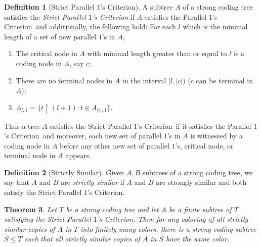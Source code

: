 \documentclass{amsart}
\newtheorem{thm}{Theorem}[section]
\theoremstyle{remark}
\theoremstyle{definition}
\newtheorem{defn}[thm]{Definition}
\theoremstyle{remark}
\newcommand{\re}{\restriction}
\newcommand{\POC}{Parallel $1$'s Criterion}
\newcommand{\SPOC}{Strict Parallel $1$'s Criterion}
\begin{document}
\begin{defn}[\SPOC]\label{defn.strPOC}
A  subtree $A$ of a strong coding tree satisfies the {\em \SPOC}
if $A$ satisfies the \POC\ and additionally, the following hold:
For each  $l$ which is  the minimal length of a set of new parallel $1$'s in $A$,
\begin{enumerate}
\item
The critical node in $A$ with minimal length greater than or equal to  $l$ is a coding node in $A$, say $c$;
\item
There are no terminal nodes in $A$ in the interval $[l,|c|)$  ($c$ can be terminal in $A$);
\item
$A_{l,1}=\{t\re (l+1):t\in A_{|c|,1}\}$.
\end{enumerate}
\end{defn}


Thus a tree $A$ satisfies the \SPOC\ if it satisfies the \POC\ and moreover,
each  new set of parallel $1$'s in $A$ is witnessed by a coding node in $A$ before any other new set of parallel $1$'s,  critical node, or terminal node in $A$ appears.



\begin{defn}[Strictly Similar]\label{defn.strictly.similar}
Given $A,B$ subtrees of a strong coding tree,
we say that $A$ and $B$ are {\em strictly similar}
if $A$ and $B$ are strongly similar and both satisfy the \SPOC.
\end{defn}



\begin{thm}\label{thm.MillikenIPOC}
Let $T$
 be a strong coding tree
and
let $A$ be a finite subtree  of $T$ satisfying the \SPOC.
Then for any coloring of all strictly similar copies of $A$ in $T$ into finitely many colors,
 there is a strong coding subtree $S\le T$ such that all strictly similar copies of $A$ in $S$ have the same color.
\end{thm}
\end{document}
